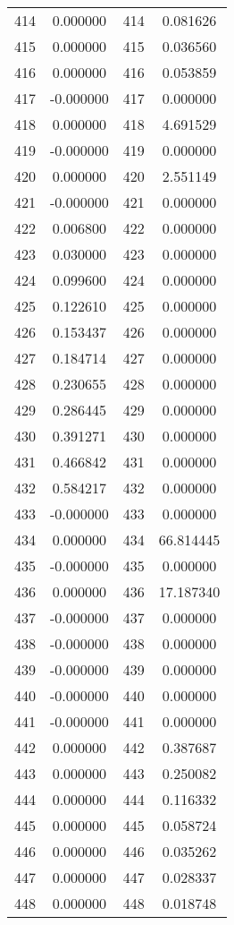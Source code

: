\documentclass[12pt]{article}
\begin{document}
\begin{longtable}{@{}cccc@{}}
414 & 0.000000 & 414 & 0.081626 \\
415 & 0.000000 & 415 & 0.036560 \\
416 & 0.000000 & 416 & 0.053859 \\
417 & -0.000000 & 417 & 0.000000 \\
418 & 0.000000 & 418 & 4.691529 \\
419 & -0.000000 & 419 & 0.000000 \\
420 & 0.000000 & 420 & 2.551149 \\
421 & -0.000000 & 421 & 0.000000 \\
422 & 0.006800 & 422 & 0.000000 \\
423 & 0.030000 & 423 & 0.000000 \\
424 & 0.099600 & 424 & 0.000000 \\
425 & 0.122610 & 425 & 0.000000 \\
426 & 0.153437 & 426 & 0.000000 \\
427 & 0.184714 & 427 & 0.000000 \\
428 & 0.230655 & 428 & 0.000000 \\
429 & 0.286445 & 429 & 0.000000 \\
430 & 0.391271 & 430 & 0.000000 \\
431 & 0.466842 & 431 & 0.000000 \\
432 & 0.584217 & 432 & 0.000000 \\
433 & -0.000000 & 433 & 0.000000 \\
434 & 0.000000 & 434 & 66.814445 \\
435 & -0.000000 & 435 & 0.000000 \\
436 & 0.000000 & 436 & 17.187340 \\
437 & -0.000000 & 437 & 0.000000 \\
438 & -0.000000 & 438 & 0.000000 \\
439 & -0.000000 & 439 & 0.000000 \\
440 & -0.000000 & 440 & 0.000000 \\
441 & -0.000000 & 441 & 0.000000 \\
442 & 0.000000 & 442 & 0.387687 \\
443 & 0.000000 & 443 & 0.250082 \\
444 & 0.000000 & 444 & 0.116332 \\
445 & 0.000000 & 445 & 0.058724 \\
446 & 0.000000 & 446 & 0.035262 \\
447 & 0.000000 & 447 & 0.028337 \\
448 & 0.000000 & 448 & 0.018748 \\

\end{longtable}
\end{document}

